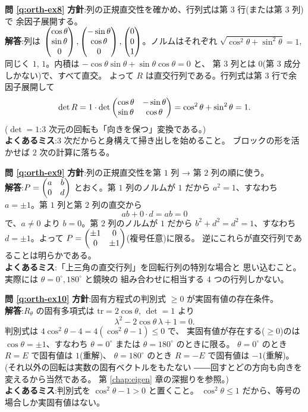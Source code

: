 \bigskip
\noindent\textbf{問 \ref{q:orth-ex8}}\quad
\textbf{方針}:列の正規直交性を確かめ、行列式は第 $3$ 行(または第 $3$ 列)で
余因子展開する。\\
\textbf{解答}:列は
$\begin{pmatrix}\cos\theta \\ \sin\theta \\ 0\end{pmatrix}, \begin{pmatrix}-\sin\theta \\ \cos\theta \\ 0\end{pmatrix},
\begin{pmatrix}0 \\ 0 \\ 1\end{pmatrix}$。ノルムはそれぞれ
$\sqrt{\cos^2\theta + \sin^2\theta} = 1$, 同じく $1$, $1$。内積は
$-\cos\theta\sin\theta + \sin\theta\cos\theta = 0$ と、
第 $3$ 列とは $0$(第 $3$ 成分しかない)で、すべて直交。
よって $R$ は直交行列である。行列式は第 $3$ 行で余因子展開して
\[
\det R = 1 \cdot \det\begin{pmatrix}\cos\theta & -\sin\theta \\ \sin\theta & \cos\theta\end{pmatrix}
= \cos^2\theta + \sin^2\theta = 1.
\]
($\det = 1$:$3$ 次元の回転も「向きを保つ」変換である。)\\
\textbf{よくあるミス}:$3$ 次だからと身構えて掃き出しを始めること。
ブロックの形を活かせば $2$ 次の計算に落ちる。

\bigskip
\noindent\textbf{問 \ref{q:orth-ex9}}\quad
\textbf{方針}:列の正規直交性を第 $1$ 列 → 第 $2$ 列の順に使う。\\
\textbf{解答}:$P = \begin{pmatrix}a & b \\ 0 & d\end{pmatrix}$ とおく。第 $1$ 列のノルムが
$1$ だから $a^2 = 1$、すなわち $a = \pm 1$。第 $1$ 列と第 $2$ 列の直交から
\[
ab + 0 \cdot d = ab = 0
\]
で、$a \neq 0$ より $b = 0$。第 $2$ 列のノルムが $1$ だから
$b^2 + d^2 = d^2 = 1$、すなわち $d = \pm 1$。よって
$P = \begin{pmatrix}\pm 1 & 0 \\ 0 & \pm 1\end{pmatrix}$(複号任意)に限る。
逆にこれらが直交行列であることは明らかである。\\
\textbf{よくあるミス}:「上三角の直交行列」を回転行列の特別な場合と
思い込むこと。実際には $\theta = 0^\circ, 180^\circ$ と鏡映の
組み合わせに相当する $4$ つの行列しかない。

\bigskip
\noindent\textbf{問 \ref{q:orth-ex10}}\quad
\textbf{方針}:固有方程式の判別式 $\ge 0$ が実固有値の存在条件。\\
\textbf{解答}:$R_\theta$ の固有多項式は
$\mathrm{tr} = 2\cos\theta$, $\det = 1$ より
\[
\lambda^2 - 2\cos\theta\,\lambda + 1 = 0.
\]
判別式は $4\cos^2\theta - 4 = 4(\cos^2\theta - 1) \le 0$ で、
実固有値が存在する($\ge 0$)のは $\cos\theta = \pm 1$、すなわち
$\theta = 0^\circ$ または $\theta = 180^\circ$ のときに限る。
$\theta = 0^\circ$ のとき $R = E$ で固有値は $1$(重解)、
$\theta = 180^\circ$ のとき $R = -E$ で固有値は $-1$(重解)。
(それ以外の回転は実数の固有ベクトルをもたない
――回すとどの方向も向きを変えるから当然である。
第 \ref{chap:eigen} 章の深掘りを参照。)\\
\textbf{よくあるミス}:判別式を $\cos^2\theta - 1 > 0$ と置くこと。
$\cos^2\theta \le 1$ だから、等号の場合しか実固有値はない。

